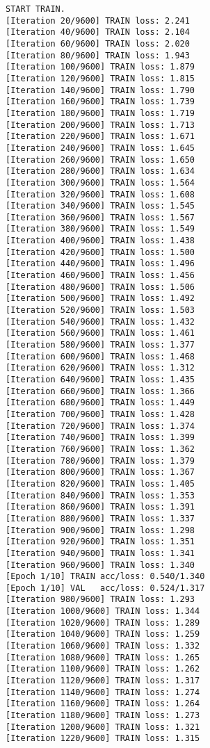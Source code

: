 \documentclass[11pt]{article}
\begin{document}
    \begin{Verbatim}[commandchars=\\\{\}]
START TRAIN.
[Iteration 20/9600] TRAIN loss: 2.241
[Iteration 40/9600] TRAIN loss: 2.104
[Iteration 60/9600] TRAIN loss: 2.020
[Iteration 80/9600] TRAIN loss: 1.943
[Iteration 100/9600] TRAIN loss: 1.879
[Iteration 120/9600] TRAIN loss: 1.815
[Iteration 140/9600] TRAIN loss: 1.790
[Iteration 160/9600] TRAIN loss: 1.739
[Iteration 180/9600] TRAIN loss: 1.719
[Iteration 200/9600] TRAIN loss: 1.713
[Iteration 220/9600] TRAIN loss: 1.671
[Iteration 240/9600] TRAIN loss: 1.645
[Iteration 260/9600] TRAIN loss: 1.650
[Iteration 280/9600] TRAIN loss: 1.634
[Iteration 300/9600] TRAIN loss: 1.564
[Iteration 320/9600] TRAIN loss: 1.608
[Iteration 340/9600] TRAIN loss: 1.545
[Iteration 360/9600] TRAIN loss: 1.567
[Iteration 380/9600] TRAIN loss: 1.549
[Iteration 400/9600] TRAIN loss: 1.438
[Iteration 420/9600] TRAIN loss: 1.500
[Iteration 440/9600] TRAIN loss: 1.496
[Iteration 460/9600] TRAIN loss: 1.456
[Iteration 480/9600] TRAIN loss: 1.506
[Iteration 500/9600] TRAIN loss: 1.492
[Iteration 520/9600] TRAIN loss: 1.503
[Iteration 540/9600] TRAIN loss: 1.432
[Iteration 560/9600] TRAIN loss: 1.461
[Iteration 580/9600] TRAIN loss: 1.377
[Iteration 600/9600] TRAIN loss: 1.468
[Iteration 620/9600] TRAIN loss: 1.312
[Iteration 640/9600] TRAIN loss: 1.435
[Iteration 660/9600] TRAIN loss: 1.366
[Iteration 680/9600] TRAIN loss: 1.449
[Iteration 700/9600] TRAIN loss: 1.428
[Iteration 720/9600] TRAIN loss: 1.374
[Iteration 740/9600] TRAIN loss: 1.399
[Iteration 760/9600] TRAIN loss: 1.362
[Iteration 780/9600] TRAIN loss: 1.379
[Iteration 800/9600] TRAIN loss: 1.367
[Iteration 820/9600] TRAIN loss: 1.405
[Iteration 840/9600] TRAIN loss: 1.353
[Iteration 860/9600] TRAIN loss: 1.391
[Iteration 880/9600] TRAIN loss: 1.337
[Iteration 900/9600] TRAIN loss: 1.298
[Iteration 920/9600] TRAIN loss: 1.351
[Iteration 940/9600] TRAIN loss: 1.341
[Iteration 960/9600] TRAIN loss: 1.340
[Epoch 1/10] TRAIN acc/loss: 0.540/1.340
[Epoch 1/10] VAL   acc/loss: 0.524/1.317
[Iteration 980/9600] TRAIN loss: 1.293
[Iteration 1000/9600] TRAIN loss: 1.344
[Iteration 1020/9600] TRAIN loss: 1.289
[Iteration 1040/9600] TRAIN loss: 1.259
[Iteration 1060/9600] TRAIN loss: 1.332
[Iteration 1080/9600] TRAIN loss: 1.265
[Iteration 1100/9600] TRAIN loss: 1.262
[Iteration 1120/9600] TRAIN loss: 1.317
[Iteration 1140/9600] TRAIN loss: 1.274
[Iteration 1160/9600] TRAIN loss: 1.264
[Iteration 1180/9600] TRAIN loss: 1.273
[Iteration 1200/9600] TRAIN loss: 1.321
[Iteration 1220/9600] TRAIN loss: 1.315

\end{Verbatim}
\end{document}
